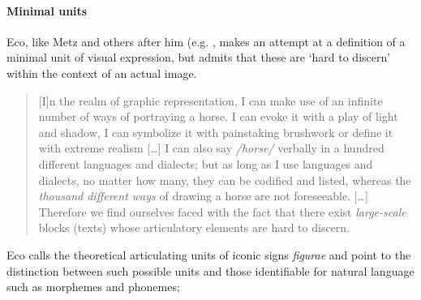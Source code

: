 \paragraph{Minimal units}

Eco, like Metz and others after him (e.g. \citet{Saint-Martin:1990}, makes an attempt at a definition of a minimal unit of visual expression, but admits that these are `hard to discern' within the context of an actual image.  

\begin{quote}%
[I]n the realm of graphic representation, I can make use of an infinite number of ways of portraying a horse. I can evoke it with a play of light and shadow, I can symbolize it with painstaking brushwork or define it with extreme realism [\ldots] I can also say \textit{/horse/} verbally in a hundred different languages and dialects; but as long as I use languages and dialects, no matter how many, they can be codified and listed, whereas the \textit{thousand different ways} of drawing a horse are not foreseeable. [\ldots] Therefore we find ourselves faced with the fact that there exist \textit{large-scale} blocks (texts) whose articulatory elements are hard to discern. \citep[214]{Eco:1976}
\end{quote}

Eco calls the theoretical articulating units of iconic signs \textit{figurae} and point to the distinction between such possible units and those identifiable for natural language such as morphemes and phonemes;

